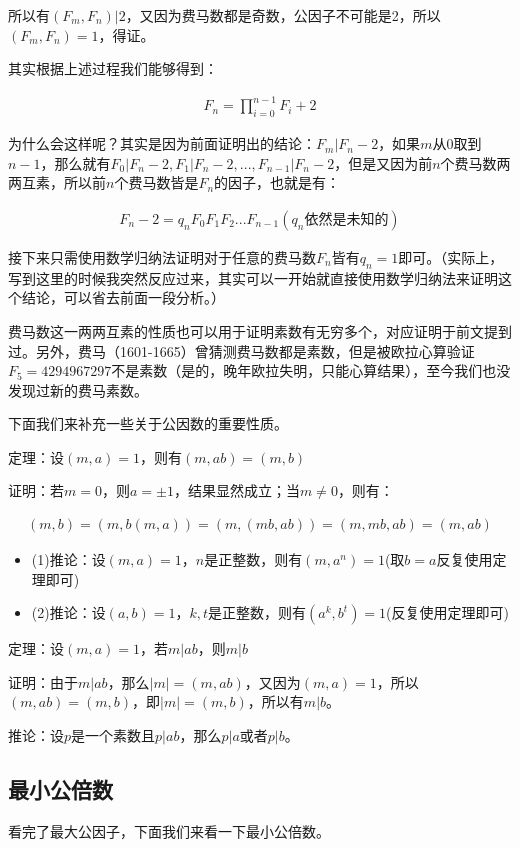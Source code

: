 \documentclass[12pt, a4paper, oneside]{ctexart}
\begin{document}
所以有$(F_m,F_n)|2$，又因为费马数都是奇数，公因子不可能是2，所以$(F_m,F_n)=1$，得证。

其实根据上述过程我们能够得到：

$$\begin{align*}
F_n=\prod_{i=0}^{n-1}F_i+2
\end{align*}$$

为什么会这样呢？其实是因为前面证明出的结论：$F_m|F_n-2$，如果$m$从0取到$n-1$，那么就有$F_0|F_n-2,F_1|F_n-2,...,F_{n-1}|F_n-2$，但是又因为前$n$个费马数两两互素，所以前$n$个费马数皆是$F_n$的因子，也就是有：

$$\begin{align*}
F_n-2=q_nF_0F_1F_2...F_{n-1}(q_n依然是未知的)
\end{align*}$$

接下来只需使用数学归纳法证明对于任意的费马数$F_n$皆有$q_n=1$即可。（实际上，写到这里的时候我突然反应过来，其实可以一开始就直接使用数学归纳法来证明这个结论，可以省去前面一段分析。）

费马数这一两两互素的性质也可以用于证明素数有无穷多个，对应证明于前文提到过。另外，费马（1601-1665）曾猜测费马数都是素数，但是被欧拉心算验证$F_5=4294967297$不是素数（是的，晚年欧拉失明，只能心算结果），至今我们也没发现过新的费马素数。

下面我们来补充一些关于公因数的重要性质。

定理：设$(m,a)=1$，则有$(m,ab)=(m,b)$

证明：若$m=0$，则$a=\pm1$，结果显然成立；当$m\neq0$，则有：

$$\begin{align*}
(m,b)=(m,b(m,a))=(m,(mb,ab))=(m,mb,ab)=(m,ab)
\end{align*}$$
\begin{itemize}
\item (1)推论：设$(m,a)=1$，$n$是正整数，则有$(m,a^n)=1$(取$b=a$反复使用定理即可)
\item (2)推论：设$(a,b)=1$，$k,t$是正整数，则有$(a^k,b^t)=1$(反复使用定理即可)
\end{itemize}

定理：设$(m,a)=1$，若$m|ab$，则$m|b$

证明：由于$m|ab$，那么$|m|=(m,ab)$，又因为$(m,a)=1$，所以$(m,ab)=(m,b)$，即$|m|=(m,b)$，所以有$m|b$。

推论：设$p$是一个素数且$p|ab$，那么$p|a$或者$p|b$。
\subsection*{最小公倍数}
看完了最大公因子，下面我们来看一下最小公倍数。
\end{document}
